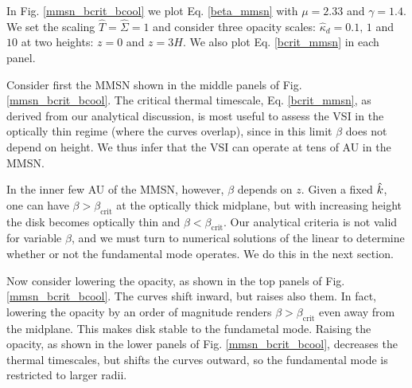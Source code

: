 In Fig. \ref{mmsn_bcrit_bcool} we plot Eq. \ref{beta_mmsn}  with $\mu
=2.33$ and $\gamma=1.4$. We set the scaling $\hat{T}=\hat{\Sigma}=1$
and consider three opacity scales: $\hat{\kappa}_d=0.1, \,1 $ and $10$
at two heights: $z=0$ and $z=3H$. We also plot Eq. \ref{bcrit_mmsn} in
each panel. 

Consider first the MMSN shown in the middle panels of
Fig. \ref{mmsn_bcrit_bcool}. The critical thermal timescale,
Eq. \ref{bcrit_mmsn}, as derived from our analytical discussion, is
most useful to assess the VSI in the optically thin regime (where the
curves overlap), since in this limit $\beta$ does not depend on
height. We thus infer that the VSI can operate at tens of AU in the
MMSN.  

In the inner few AU of the MMSN, however, $\beta$ depends on $z$. 
Given a fixed $\hat{k}$, one can have $\beta > \beta_\mathrm{crit}$ at
the optically thick midplane, but with increasing height the disk
becomes optically thin and $\beta<\beta_\mathrm{crit}$. Our analytical
criteria is not valid for variable $\beta$, and we must turn to
numerical solutions of the linear to determine whether or not the
fundamental mode operates. We do this in the next
section.   
 
Now consider lowering the opacity, as shown in the top panels of
Fig. \ref{mmsn_bcrit_bcool}. The curves shift inward, but raises also
them. In fact, lowering the opacity by an order of magnitude renders
$\beta > \beta_\mathrm{crit}$ even away from the midplane. This makes
disk stable to the fundametal mode. Raising the opacity, as shown in
the lower panels of Fig. \ref{mmsn_bcrit_bcool}, decreases the thermal
timescales, but shifts the curves outward, so the fundamental mode is
restricted to larger radii.  


